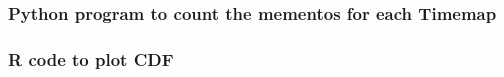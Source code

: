 \begin{enumerate}
\subsubsection{Python program to count the mementos for each Timemap}

\newpage

\subsubsection{R code to plot CDF}

\newpage

\newpage


\end{enumerate}
